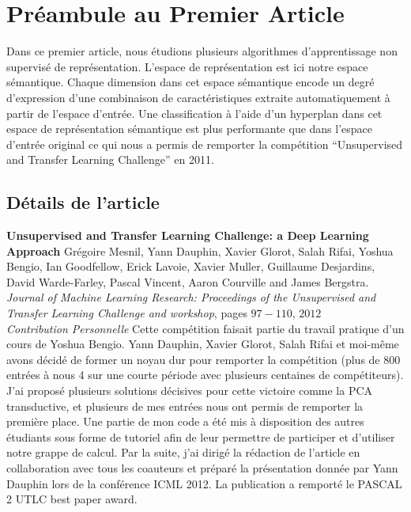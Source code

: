 \chapter{Pr\'{e}ambule au Premier Article }

Dans ce premier article, nous étudions plusieurs algorithmes d'apprentissage
non supervisé de représentation. L'espace de représentation est ici notre
espace sémantique. Chaque dimension dans cet espace sémantique encode un degré
d'expression d'une combinaison de caractéristiques extraite automatiquement à
partir de l'espace d'entrée. Une classification à l'aide d'un hyperplan dans
cet espace de représentation sémantique est plus performante que dans l'espace
d'entrée original ce qui nous a permis de remporter la compétition
``Unsupervised and Transfer Learning Challenge'' en 2011. 

\section{D\'{e}tails de l'article}

{\bf Unsupervised and Transfer Learning Challenge: a Deep Learning Approach}
Gr\'{e}goire Mesnil, Yann Dauphin, Xavier Glorot, Salah Rifai, Yoshua Bengio,
Ian Goodfellow, Erick Lavoie, Xavier Muller, Guillaume Desjardins, David
Warde-Farley, Pascal Vincent, Aaron Courville and James Bergstra. {\it Journal
of Machine Learning Research: Proceedings of the Unsupervised and Transfer
Learning Challenge and workshop}, pages $97-110$, $2012$ \\

{\it Contribution Personnelle} Cette comp\'{e}tition faisait partie du travail
pratique d'un cours de Yoshua Bengio. Yann Dauphin, Xavier Glorot, Salah Rifai
et moi-m\^{e}me avons d\'{e}cid\'{e} de former un noyau dur pour remporter la
comp\'{e}tition (plus de 800 entr\'{e}es \`{a} nous 4 sur une courte
p\'{e}riode avec plusieurs centaines de comp\'{e}titeurs).  J'ai propos\'{e}
plusieurs solutions d\'{e}cisives pour cette victoire comme la
PCA transductive, et plusieurs de mes entr\'{e}es nous ont permis de remporter
la premi\`{e}re place. Une partie de mon code a \'{e}t\'{e} mis \`{a}
disposition des autres \'{e}tudiants sous forme de tutoriel afin de leur
permettre de participer et d'utiliser notre grappe de calcul. Par la suite,
j'ai dirig\'{e} la r\'{e}daction de l'article en collaboration avec tous les
coauteurs et pr\'{e}par\'{e} la pr\'{e}sentation donn\'{e}e par Yann Dauphin
lors de la conf\'{e}rence ICML 2012. La publication a remport\'{e} le PASCAL 2 UTLC
best paper award. 

